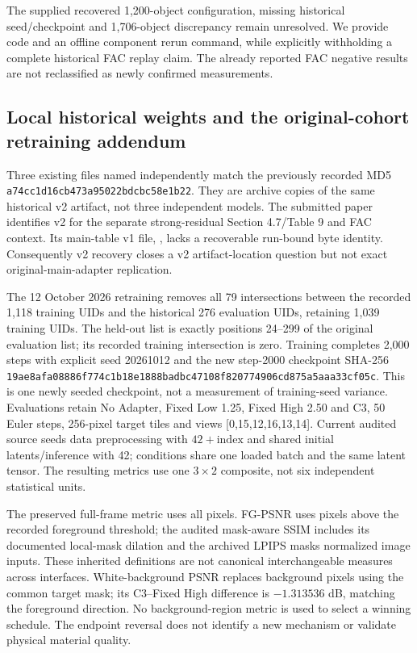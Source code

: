 \documentclass[11pt]{article}
\begin{document}
The supplied recovered 1,200-object configuration, missing historical seed/checkpoint and 1,706-object discrepancy remain unresolved. We provide code and an offline component rerun command, while explicitly withholding a complete historical FAC replay claim. The already reported FAC negative results are not reclassified as newly confirmed measurements.

\subsection*{Local historical weights and the original-cohort retraining addendum}\label{supp:original276-retrain}
Three existing files named  independently match the previously recorded MD5 \texttt{a74cc1d16cb473a95022bdcbc58e1b22}. They are archive copies of the same historical v2 artifact, not three independent models. The submitted paper identifies v2 for the separate strong-residual Section 4.7/Table 9 and FAC context. Its main-table v1 file, , lacks a recoverable run-bound byte identity. Consequently v2 recovery closes a v2 artifact-location question but not exact original-main-adapter replication.

The 12 October 2026 retraining removes all 79 intersections between the recorded 1,118 training UIDs and the historical 276 evaluation UIDs, retaining 1,039 training UIDs. The held-out list is exactly positions 24--299 of the original evaluation list; its recorded training intersection is zero. Training completes 2,000 steps with explicit seed 20261012 and the new step-2000 checkpoint SHA-256 \texttt{19ae8afa08886f774c1b18e1888badbc47108f820774906cd875a5aaa33cf05c}. This is one newly seeded checkpoint, not a measurement of training-seed variance. Evaluations retain No Adapter, Fixed Low 1.25, Fixed High 2.50 and C3, 50 Euler steps, 256-pixel target tiles and views [0,15,12,16,13,14]. Current audited source seeds data preprocessing with $42+\mathrm{index}$ and shared initial latents/inference with 42; conditions share one loaded batch and the same latent tensor. The resulting metrics use one $3\times2$ composite, not six independent statistical units.

The preserved full-frame metric uses all pixels. FG-PSNR uses pixels above the recorded foreground threshold; the audited mask-aware SSIM includes its documented local-mask dilation and the archived LPIPS masks normalized image inputs. These inherited definitions are not canonical interchangeable measures across interfaces. White-background PSNR replaces background pixels using the common target mask; its C3--Fixed High difference is $-1.313536$ dB, matching the foreground direction. No background-region metric is used to select a winning schedule. The endpoint reversal does not identify a new mechanism or validate physical material quality.
\end{document}
